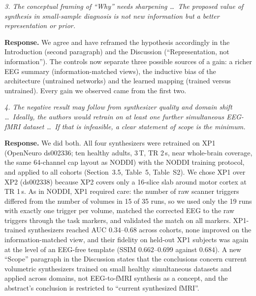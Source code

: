 \documentclass[11pt]{article}
\newcommand{\rc}[1]{\par\medskip\noindent\textit{#1}\par\smallskip}
\newcommand{\resp}{\noindent\textbf{Response.} }
\begin{document}
\rc{3. The conceptual framing of ``Why'' needs sharpening \ldots\ The proposed value of synthesis in small-sample diagnosis is not new information but a better representation or prior.}
\resp We agree and have reframed the hypothesis accordingly in the Introduction (second paragraph) and the Discussion (``Representation, not information''). The controls now separate three possible sources of a gain: a richer EEG summary (information-matched views), the inductive bias of the architecture (untrained networks) and the learned mapping (trained versus untrained). Every gain we observed came from the first two.

\rc{4. The negative result may follow from synthesizer quality and domain shift \ldots\ Ideally, the authors would retrain on at least one further simultaneous EEG-fMRI dataset \ldots\ If that is infeasible, a clear statement of scope is the minimum.}
\resp We did both. All four synthesizers were retrained on XP1 (OpenNeuro ds002336; ten healthy adults, 3\,T, TR 2\,s, near whole-brain coverage, the same 64-channel cap layout as NODDI) with the NODDI training protocol, and applied to all cohorts (Section~3.5, Table~5, Table~S2). We chose XP1 over XP2 (ds002338) because XP2 covers only a 16-slice slab around motor cortex at TR 1\,s. As in NODDI, XP1 required care: the number of raw scanner triggers differed from the number of volumes in 15 of 35 runs, so we used only the 19 runs with exactly one trigger per volume, matched the corrected EEG to the raw triggers through the task markers, and validated the match on all markers. XP1-trained synthesizers reached AUC $0.34$--$0.68$ across cohorts, none improved on the information-matched view, and their fidelity on held-out XP1 subjects was again at the level of an EEG-free template (SSIM $0.662$--$0.699$ against $0.684$). A new ``Scope'' paragraph in the Discussion states that the conclusions concern current volumetric synthesizers trained on small healthy simultaneous datasets and applied across domains, not EEG-to-fMRI synthesis as a concept, and the abstract's conclusion is restricted to ``current synthesized fMRI''.
\end{document}
